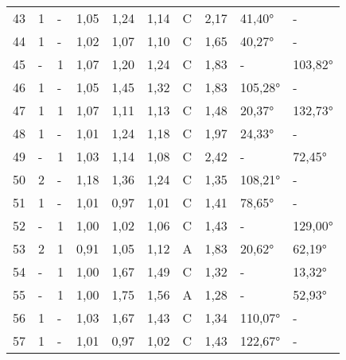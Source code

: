 \begin{longtable}{p{0.7cm}p{1.4cm}p{1.4cm}p{1cm}p{1cm}p{1cm}p{1cm}p{1cm}p{1cm}p{1cm}}
\small{43} & \small{1} & \small{-} & \small{1,05} & \small{1,24} & \small{1,14} & \small{C} & \small{2,17} & \small{41,40°} & \small{-}\\
\small{44} & \small{1} & \small{-} & \small{1,02} & \small{1,07} & \small{1,10} & \small{C} & \small{1,65} & \small{40,27°} & \small{-}\\
\small{45} & \small{-} & \small{1} & \small{1,07} & \small{1,20} & \small{1,24} & \small{C} & \small{1,83} & \small{-} & \small{103,82°}\\
\small{46} & \small{1} & \small{-} & \small{1,05} & \small{1,45} & \small{1,32} & \small{C} & \small{1,83} & \small{105,28°} & \small{-}\\
\small{47} & \small{1} & \small{1} & \small{1,07} & \small{1,11} & \small{1,13} & \small{C} & \small{1,48} & \small{20,37°} & \small{132,73°}\\
\small{48} & \small{1} & \small{-} & \small{1,01} & \small{1,24} & \small{1,18} & \small{C} & \small{1,97} & \small{24,33°} & \small{-}\\
\small{49} & \small{-} & \small{1} & \small{1,03} & \small{1,14} & \small{1,08} & \small{C} & \small{2,42} & \small{-} & \small{72,45°}\\
\small{50} & \small{2} & \small{-} & \small{1,18} & \small{1,36} & \small{1,24} & \small{C} & \small{1,35} & \small{108,21°} & \small{-}\\
\small{51} & \small{1} & \small{-} & \small{1,01} & \small{0,97} & \small{1,01} & \small{C} & \small{1,41} & \small{78,65°} & \small{-}\\
\small{52} & \small{-} & \small{1} & \small{1,00} & \small{1,02} & \small{1,06} & \small{C} & \small{1,43} & \small{-} & \small{129,00°}\\
\small{53} & \small{2} & \small{1} & \small{0,91} & \small{1,05} & \small{1,12} & \small{A} & \small{1,83} & \small{20,62°} & \small{62,19°}\\
\small{54} & \small{-} & \small{1} & \small{1,00} & \small{1,67} & \small{1,49} & \small{C} & \small{1,32} & \small{-} & \small{13,32°}\\
\small{55} & \small{-} & \small{1} & \small{1,00} & \small{1,75} & \small{1,56} & \small{A} & \small{1,28} & \small{-} & \small{52,93°}\\
\small{56} & \small{1} & \small{-} & \small{1,03} & \small{1,67} & \small{1,43} & \small{C} & \small{1,34} & \small{110,07°} & \small{-}\\
\small{57} & \small{1} & \small{-} & \small{1,01} & \small{0,97} & \small{1,02} & \small{C} & \small{1,43} & \small{122,67°} & \small{-}\\

\end{longtable}
